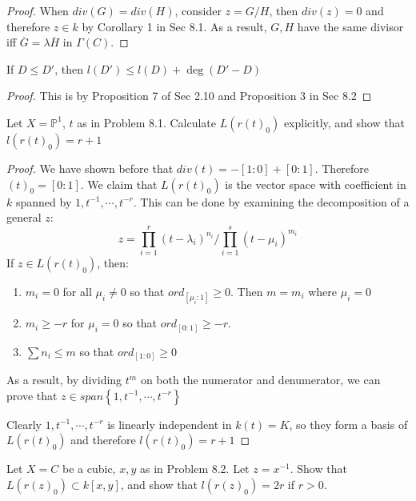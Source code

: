 \documentclass{solution}
\begin{document}
\begin{proof}
    When $div(G) = div(H)$, consider $z = G / H$, then $div(z) = 0$ and therefore $z \in k$ by Corollary 1 in Sec 8.1. As a result, $G, H$ have the same divisor iff $\overline{G} = \lambda \overline{H}$ in $\Gamma(C)$.
\end{proof}

\begin{problem}{8.8}
    If $D \le D'$, then $l(D') \le l(D) + \deg (D' - D)$
\end{problem}

\begin{proof}
    This is by Proposition 7 of Sec 2.10 and Proposition 3 in Sec 8.2
\end{proof}

\begin{problem}{8.9}
    Let $X = \mathbb{P}^1$, $t$ as in Problem 8.1. Calculate $L(r(t)_0)$ explicitly, and show that $l(r(t)_0) = r + 1$
\end{problem}

\begin{proof}
    We have shown before that $div(t) = -[1:0] + [0:1]$. Therefore $(t)_0 = [0:1]$. We claim that $L(r(t)_0)$ is the vector space with coefficient in $k$ spanned by $1, t^{-1}, \cdots, t^{-r}$. This can be done by examining the decomposition of a general $z$:
    $$z = \prod\limits_{i = 1}^{r} (t - \lambda_i)^{n_i} / \prod\limits_{i = 1}^{s} (t - \mu_i)^{m_i}$$
    If $z \in L(r(t)_0)$, then:
    \begin{enumerate}
        \item $m_i = 0$ for all $\mu_i \ne 0$ so that $ord_{[\mu_i:1]} \ge 0$. Then $m = m_i$ where $\mu_i = 0$
        \item $m_i \ge -r$ for $\mu_i = 0$ so that $ord_{[0:1]} \ge -r$. 
        \item $\sum n_i \le m$ so that $ord_{[1:0]} \ge 0$
    \end{enumerate}
    As a result, by dividing $t^m$ on both the numerator and denumerator, we can prove that $z \in span \left\lbrace 1, t^{-1}, \cdots, t^{-r} \right\rbrace$

    Clearly $1, t^{-1}, \cdots, t^{-r}$ is linearly independent in $k(t) = K$, so they form a basis of $L(r(t)_0)$ and therefore $l(r(t)_0) = r + 1$
\end{proof}

\begin{problem}{8.10}
    Let $X = C$ be a cubic, $x, y$ as in Problem 8.2. Let $z = x ^{-1}$. Show that $L(r(z)_0) \subset k[x, y]$, and show that $l(r(z)_0) = 2r$ if $r \gt 0$.
\end{problem}
\end{document}
